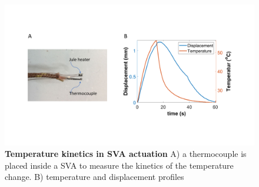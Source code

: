 \begin{figure}[!htb]
\centering
\includegraphics[width=\textwidth]{tempKinetics.pdf}
    \caption[]{\textbf{Temperature kinetics in SVA actuation} A) a thermocouple is placed inside a SVA to measure the kinetics of the temperature change. B) temperature and displacement profiles }
    \label{fig:tempKinetics}
\end{figure}

